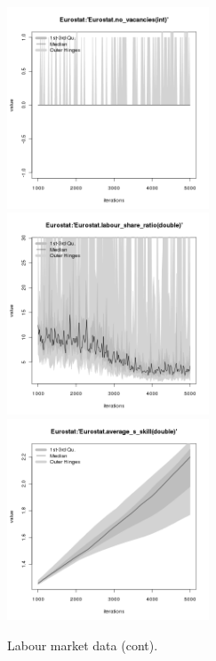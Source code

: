\begin{figure}[H!]
\centering\leavevmode
\begin{minipage}{14cm}
\centering\leavevmode
\includegraphics[width=6cm]{./png/tax_0.10/Eurostat-no_vacancies.png}
\includegraphics[width=6cm]{./png/tax_0.10/Eurostat-labour_share_ratio.png}\\
\includegraphics[width=6cm]{./png/tax_0.10/Eurostat-average_s_skill.png}
\end{minipage}
\caption{Labour market data (cont).}
\label{Figure: Labour Market 2}
\end{figure}

\clearpage


